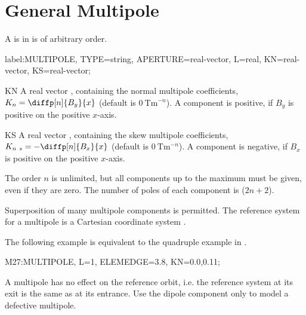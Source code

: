 \clearpage
\section{General Multipole}
\label{sec:multipole}
A  is in \opalt is of arbitrary order.
\begin{example}
label:MULTIPOLE, TYPE=string, APERTURE=real-vector,
      L=real, KN=real-vector, KS=real-vector;
\end{example}
\begin{kdescription}
\item[KN]
  A real vector , 
  containing the normal multipole coefficients,
  $K_n=\diffp[n]{B_y}{x}$
  (default is $\SI{0}{\tesla\meter\tothe{-n}}$).
  A component is positive, if $B_y$ is positive on the positive $x$-axis.
\item[KS]
  A real vector ,
  containing the skew multipole coefficients,
  $K_{n~s}=-\diffp[n]{B_x}{x}$
  (default is $\SI{0}{\tesla\meter\tothe{-n}}$).
  A component is negative, if $B_x$ is positive on the positive $x$-axis.
\end{kdescription}
The order $n$ is unlimited, but all components up to the maximum must be given, even if they are zero.
The number of poles of each component is ($2 n + 2$).

Superposition of many multipole components is permitted.
The reference system for a multipole is a Cartesian coordinate system
.

\noindent The following example is equivalent to the quadruple example in .
\begin{example}
M27:MULTIPOLE, L=1, ELEMEDGE=3.8, KN={0.0,0.11};
\end{example}
A multipole has no effect on the reference orbit, i.e. the reference system at its exit is the same as at its entrance. Use the dipole component only to model a defective multipole.

\clearpage
